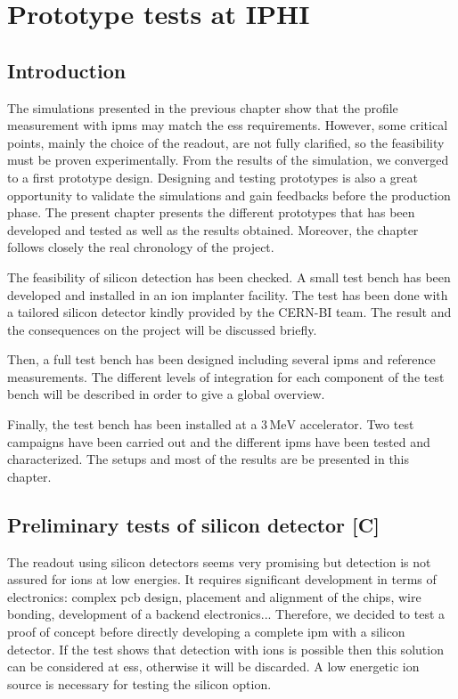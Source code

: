 \chapter{Prototype tests at IPHI}
\cleardoublepage

\minitoc

\section{Introduction}
\begin{refsection}
  \label{ch4:Introduction [C]}
  The simulations presented in the previous chapter show that the profile measurement with \acrshort{ipm}s may match the \acrshort{ess} requirements. However, some critical points, mainly the choice of the readout, are not fully clarified, so the feasibility must be proven experimentally. From the results of the simulation, we converged to a first prototype design. Designing and testing prototypes is also a great opportunity to validate the simulations and gain feedbacks before the production phase. The present chapter presents the different prototypes that has been developed and tested as well as the results obtained. Moreover, the chapter follows closely the real chronology of the project.

  The feasibility of silicon detection has been checked. A small test bench has been developed and installed in an ion implanter facility. The test has been done with a tailored silicon detector kindly provided by the CERN-BI team. The result and the consequences on the project will be discussed briefly.

  Then, a full test bench has been designed including several \acrshort{ipm}s and reference measurements. The different levels of integration for each component of the test bench will be described in order to give a global overview.

  Finally, the test bench has been installed at a $3\,\mathrm{MeV}$ accelerator. Two test campaigns have been carried out and the different \acrshort{ipm}s have been tested and characterized. The setups and most of the results are be presented in this chapter.

  \section{Preliminary tests of silicon detector [C]}
  The readout using silicon detectors seems very promising but detection is not assured for ions at low energies. It requires significant development in terms of electronics: complex \acrshort{pcb} design, placement and alignment of the chips, wire bonding, development of a backend electronics... Therefore, we decided to test a proof of concept before directly developing a complete \acrshort{ipm} with a silicon detector. If the test shows that detection with ions is possible then this solution can be considered at \acrshort{ess}, otherwise it will be discarded. A low energetic ion source is necessary for testing the silicon option.


\end{refsection}
